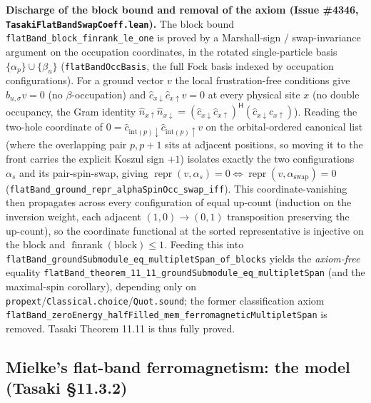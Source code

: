 \documentclass[a4paper,11pt]{article}
\begin{document}
\smallskip\noindent\textbf{Discharge of the block bound and removal of the axiom
(Issue \#4346, \texttt{TasakiFlatBandSwapCoeff.lean}).}  The block bound
\texttt{flatBand\_block\_finrank\_le\_one} is proved by a Marshall-sign / swap-invariance
argument on the occupation coordinates, in the rotated single-particle basis
$\{\alpha_p\}\cup\{\beta_u\}$ (\texttt{flatBandOccBasis}, the full Fock basis indexed by
occupation configurations). For a ground vector $v$ the local frustration-free conditions
give $\hat b_{u,\sigma}v=0$ (no $\beta$-occupation) and $\hat c_{x\downarrow}\hat
c_{x\uparrow}v=0$ at every physical site $x$ (no double occupancy, the Gram identity
$\hat n_{x\uparrow}\hat n_{x\downarrow}=(\hat c_{x\downarrow}\hat
c_{x\uparrow})^{\mathsf H}(\hat c_{x\downarrow}\hat c_{x\uparrow})$). Reading the
two-hole coordinate of $0=\hat c_{\mathrm{int}(p)\downarrow}\hat
c_{\mathrm{int}(p)\uparrow}v$ on the orbital-ordered canonical list (where the
overlapping pair $p,p+1$ sits at adjacent positions, so moving it to the front carries
the explicit Koszul sign $+1$) isolates exactly the two configurations $\alpha_s$ and its
pair-spin-swap, giving $\operatorname{repr}(v,\alpha_s)=0\Leftrightarrow
\operatorname{repr}(v,\alpha_{\mathrm{swap}})=0$
(\texttt{flatBand\_ground\_repr\_alphaSpinOcc\_swap\_iff}). This coordinate-vanishing
then propagates across every configuration of equal up-count (induction on the inversion
weight, each adjacent $(1,0)\to(0,1)$ transposition preserving the up-count), so the
coordinate functional at the sorted representative is injective on the block and
$\operatorname{finrank}(\text{block})\leq 1$. Feeding this into
\texttt{flatBand\_groundSubmodule\_eq\_multipletSpan\_of\_blocks} yields the
\emph{axiom-free} equality \texttt{flatBand\_theorem\_11\_11\_groundSubmodule\_eq\_multipletSpan}
(and the maximal-spin corollary), depending only on
\texttt{propext}/\texttt{Classical.choice}/\texttt{Quot.sound}; the former classification
axiom \texttt{flatBand\_zeroEnergy\_halfFilled\_mem\_ferromagneticMultipletSpan} is
removed. Tasaki Theorem 11.11 is thus fully proved.

\subsection{Mielke's flat-band ferromagnetism: the model (Tasaki §11.3.2)}
\end{document}
